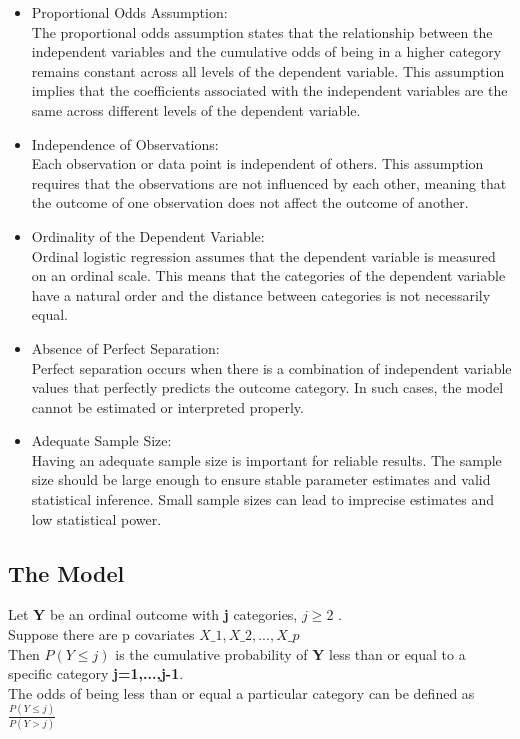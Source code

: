 \documentclass[12pt]{article}
\numberwithin{equation}{section}
\begin{document}
\begin{itemize}
	\item Proportional Odds Assumption:\\
	The proportional odds assumption states that the relationship between the independent variables and the cumulative odds of being in a higher category remains constant across all levels of the dependent variable. This assumption implies that the coefficients associated with the independent variables are the same across different levels of the dependent variable.
	
	\item Independence of Observations:\\
	Each observation or data point is independent of others. This assumption requires that the observations are not influenced by each other, meaning that the outcome of one observation does not affect the outcome of another.
	
	\item Ordinality of the Dependent Variable:\\
	Ordinal logistic regression assumes that the dependent variable is measured on an ordinal scale. This means that the categories of the dependent variable have a natural order and the distance between categories is not necessarily equal. 
	
	\item Absence of Perfect Separation:\\
	Perfect separation occurs when there is a combination of independent variable values that perfectly predicts the outcome category. In such cases, the model cannot be estimated or interpreted properly. 
	
	\item Adequate Sample Size:\\
	Having an adequate sample size is important for reliable results. The sample size should be large enough to ensure stable parameter estimates and valid statistical inference. Small sample sizes can lead to imprecise estimates and low statistical power.
\end{itemize}
	
\subsection{The Model}
\noindent
Let \textbf{Y} be an ordinal outcome with \textbf{j} categories, \textbf{$j \ge 2$}  . \\
Suppose there are p covariates $X\_1,X\_2,...,X\_p$\\
Then \textbf{$P(Y\le j)$} is the cumulative probability of \textbf{Y} less than or equal to a specific category \textbf{j=1,...,j-1}.\\
The odds of being less than or equal a particular category can be defined as 	$\frac{P(Y\le j)}{P(Y> j)}$
	
\end{document}
